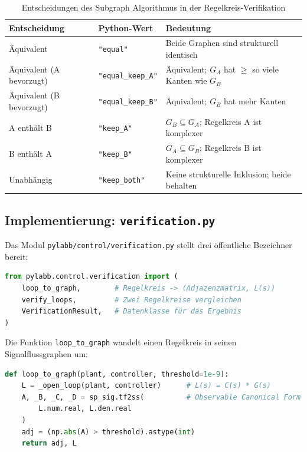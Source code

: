 \documentclass[a4paper,12pt]{article}
\theoremstyle{definition}
\begin{document}
\begin{table}[h]
\centering
\begin{tabular}{@{}ll p{7cm}@{}}
\toprule
\textbf{Entscheidung} & \textbf{Python-Wert} & \textbf{Bedeutung} \\
\midrule
Äquivalent              & \texttt{"equal"}        & Beide Graphen sind strukturell identisch \\
Äquivalent (A bevorzugt)& \texttt{"equal\_keep\_A"}& Äquivalent; $G_A$ hat $\geq$ so viele Kanten wie $G_B$ \\
Äquivalent (B bevorzugt)& \texttt{"equal\_keep\_B"}& Äquivalent; $G_B$ hat mehr Kanten \\
A enthält B             & \texttt{"keep\_A"}       & $G_B \subseteq G_A$; Regelkreis A ist komplexer \\
B enthält A             & \texttt{"keep\_B"}       & $G_A \subseteq G_B$; Regelkreis B ist komplexer \\
Unabhängig              & \texttt{"keep\_both"}    & Keine strukturelle Inklusion; beide behalten \\
\bottomrule
\end{tabular}
\caption{Entscheidungen des Subgraph Algorithmus in der Regelkreis-Verifikation}
\label{tab:decisions}
\end{table}

\subsection{Implementierung: \texttt{verification.py}}

Das Modul \texttt{pylabb/control/verification.py} stellt drei öffentliche
Bezeichner bereit:

\begin{lstlisting}[language=Python, caption=Öffentliche API des Verifikationsmoduls]
from pylabb.control.verification import (
    loop_to_graph,        # Regelkreis -> (Adjazenzmatrix, L(s))
    verify_loops,         # Zwei Regelkreise vergleichen
    VerificationResult,   # Datenklasse für das Ergebnis
)
\end{lstlisting}

Die Funktion \texttt{loop\_to\_graph} wandelt einen Regelkreis in seinen
Signalflussgraphen um:

\begin{lstlisting}[language=Python, caption=Implementierung von loop\_to\_graph]
def loop_to_graph(plant, controller, threshold=1e-9):
    L = _open_loop(plant, controller)      # L(s) = C(s) * G(s)
    A, _B, _C, _D = sp_sig.tf2ss(          # Observable Canonical Form
        L.num.real, L.den.real
    )
    adj = (np.abs(A) > threshold).astype(int)
    return adj, L
\end{lstlisting}
\end{document}
